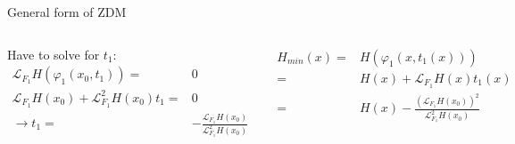 \documentclass[xcolor=x11names,compress]{beamer}
\renewcommand{\(}{\begin{columns}}
\renewcommand{\)}{\end{columns}}
\newcommand{\<}[1]{\begin{column}{#1}}
\renewcommand{\>}{\end{column}}
\newcommand{\lien}[2]{\mathcal{L}_{#1}^{#2}}
\newcommand{\lie}[1]{\mathcal{L}_{#1}}
\begin{document}
\begin{frame}{General form of ZDM}
\begin{columns}[c]
Have to solve for $t_1$:\\
\begin{align*}
\lie{F_1}H(\varphi_1(x_0,t_1))=&0\\
\lie{F_1}H(x_0)+\lien{F_1}{2}H(x_0)t_1=&0\\
\rightarrow t_1=&-\frac{\lie{F_1}H(x_0)}{\lien{F_1}{2}H(x_0)}
\end{align*}

\begin{align}
\label{eq-hmin}
H_{min}(x)=&H(\varphi_1(x,t_1(x)))\\
=&H(x)+\lie{F_1}H(x)t_1(x)\\
=&H(x)-\frac{(\lie{F_1}H(x_0))^2}{\lien{F_1}{2}H(x_0)}
\end{align}


\begin{center}
\includegraphics[width=\textwidth]{ZDM}
\end{center}
\end{columns}
\end{frame}
\end{document}
